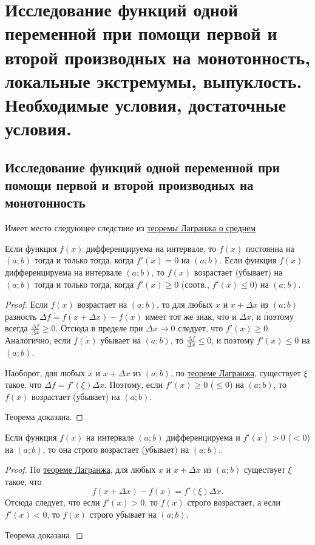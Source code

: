 \chapter{Исследование функций одной переменной при помощи первой и второй производных на монотонность, локальные экстремумы, выпуклость. Необходимые условия, достаточные условия.}

\section{Исследование функций одной переменной при помощи первой и второй производных на монотонность}

Имеет место следующее следствие из \hyperref[ch4t1]{теоремы Лагранжа о среднем}

\begin{thm}
Если функция $f(x)$ дифференцируема на интервале, то $f(x)$ постоянна на $(a;b)$ тогда и только тогда, когда $f'(x)=0$ на $(a;b)$. Если функция $f(x)$ дифференцируема на интервале $(a;b)$, то $f(x)$ возрастает (убывает) на $(a;b)$ тогда и только тогда, когда $f'(x)\ge 0$ (соотв., $f'(x)\le 0$) на $(a;b)$.
\end{thm}
 
\begin{proof} Если $f(x)$ возрастает на $(a;b)$, то для любых $x$ и $x+\Delta x$ из $(a;b)$ разность $\Delta f = f(x+\Delta x) - f(x)$ имеет тот же знак, что и $\Delta x$, и поэтому всегда $\frac{\Delta f}{\Delta x} \ge 0$. Отсюда в пределе при $\Delta x \to 0$ следует, что $f'(x) \ge 0$. Аналогично, если $f(x)$ убывает на $(a;b)$, то $\frac{\Delta f}{\Delta x} \le 0$, и поэтому $f'(x) \le 0$ на $(a;b)$.

    Наоборот, для любых $x$ и $x + \Delta x$ из $(a;b)$, по \hyperref[ch4t1]{теореме Лагранжа}, существует $\xi$ такое, что $\Delta f = f'(\xi)\Delta x$. Поэтому, если $f'(x) \ge 0$ ($\le 0$) на $(a;b)$, то $f(x)$ возрастает (убывает) на $(a;b)$.

Теорема доказана.
\end{proof}

\begin{thm}  Если функция $f(x)$ на интервале $(a;b)$ дифференцируема и $f'(x) > 0$ ($< 0$) на $(a;b)$, то она строго возрастает (убывает) на $(a;b)$.
\end{thm}
\begin{proof}
    По \hyperref[ch4t1]{теореме Лагранжа}, для любых $x$ и $x + \Delta x$ из $(a; b)$ существует $\xi$ такое, что
$$
f(x+\Delta x)-f(x)=f'(\xi)\Delta x.
$$
Отсюда следует, что если $f'(x) > 0$, то $f(x)$ строго возрастает, а если $f'(x) < 0$, то $f(x)$ строго убывает на $(a;b)$. 

Теорема доказана.
\end{proof}

